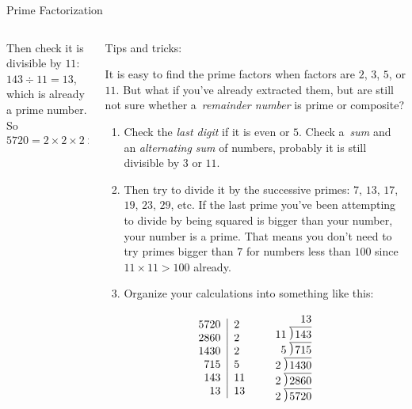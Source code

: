 \documentclass[9pt,aspectratio=169]{beamer}
\newcommand\Mydiv[2]{%
$\strut#1$\kern.25em\smash{\raise.3ex\hbox{$\big)$}}$\mkern-8mu
        \overline{\enspace\strut#2}$}
\begin{document}
\begin{frame}{Prime Factorization}
\begin{columns}[T]
\begin{column}{0.5\textwidth}
{      Then check it is divisible by $11$: $143 \div 11 = 13$, which is already a prime number. So}
      \[ 5720 = 2 \times 2 \times 2 \times 5 \times 11 \times 13 = 2^3 \times 5 \times 11 \times 13.\]
    \end{column}
    \begin{column}{0.5\textwidth}
      {\color{textBlue} Tips and tricks:}
      {\small
      It is easy to find the prime factors when factors are $2$, $3$, $5$, or $11$. But what if you've already extracted them, but are still not sure whether a~\emph{remainder number} is prime or composite?
      \begin{enumerate}
        \item Check the \emph{last digit} if it is even or $5$. Check a~\emph{sum} and an \emph{alternating sum} of numbers, probably it is still divisible by $3$ or $11$.
        \item Then try to divide it by the successive primes: $7$, $13$, $17$, $19$, $23$, $29$, etc. If the last prime you've been attempting to divide by being squared is bigger than your number, your number is a prime. That means you don't need to try primes bigger than $7$ for numbers less than $100$ since $11 \times 11 > 100$ already.
        \item Organize your calculations into something like this:
      \end{enumerate}\vspace*{-0.5ex}
      \[
        \begin{tabular}{c c}
          \begin{tabular}{r|l}
            5720 & 2 \\
            2860 & 2 \\
            1430 & 2 \\
             715 & 5 \\
             143 & 11 \\
              13 & 13 \\
          \end{tabular} 
          &
          \begin{tabular}{r}
            13\\\
            \Mydiv{11}{143}\\
            \Mydiv{5}{715}\\
            \Mydiv{2}{1430}\\
            \Mydiv{2}{2860}\\
            \Mydiv{2}{5720}
          \end{tabular}
        \end{tabular}
      \]
      }
    \end{column}
  \end{columns}
\end{frame}
\end{document}
